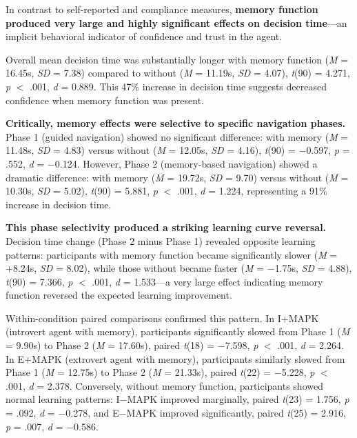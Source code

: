 \documentclass[12pt]{article}
\begin{document}
In contrast to self-reported and compliance measures, \textbf{memory function produced very large and highly significant effects on decision time}---an implicit behavioral indicator of confidence and trust in the agent.

Overall mean decision time was substantially longer with memory function (\textit{M} = 16.45s, \textit{SD} = 7.38) compared to without (\textit{M} = 11.19s, \textit{SD} = 4.07), \textit{t}(90) = 4.271, \textit{p} $<$ .001, \textit{d} = 0.889. This 47\% increase in decision time suggests decreased confidence when memory function was present.

\textbf{Critically, memory effects were selective to specific navigation phases.} Phase 1 (guided navigation) showed no significant difference: with memory (\textit{M} = 11.48s, \textit{SD} = 4.83) versus without (\textit{M} = 12.05s, \textit{SD} = 4.16), \textit{t}(90) = $-$0.597, \textit{p} = .552, \textit{d} = $-$0.124. However, Phase 2 (memory-based navigation) showed a dramatic difference: with memory (\textit{M} = 19.72s, \textit{SD} = 9.70) versus without (\textit{M} = 10.30s, \textit{SD} = 5.02), \textit{t}(90) = 5.881, \textit{p} $<$ .001, \textit{d} = 1.224, representing a 91\% increase in decision time.

\textbf{This phase selectivity produced a striking learning curve reversal.} Decision time change (Phase 2 minus Phase 1) revealed opposite learning patterns: participants with memory function became significantly slower (\textit{M} = +8.24s, \textit{SD} = 8.02), while those without became faster (\textit{M} = $-$1.75s, \textit{SD} = 4.88), \textit{t}(90) = 7.366, \textit{p} $<$ .001, \textit{d} = 1.533---a very large effect indicating memory function reversed the expected learning improvement.

Within-condition paired comparisons confirmed this pattern. In I+MAPK (introvert agent with memory), participants significantly slowed from Phase 1 (\textit{M} = 9.90s) to Phase 2 (\textit{M} = 17.60s), paired \textit{t}(18) = $-$7.598, \textit{p} $<$ .001, \textit{d} = 2.264. In E+MAPK (extrovert agent with memory), participants similarly slowed from Phase 1 (\textit{M} = 12.75s) to Phase 2 (\textit{M} = 21.33s), paired \textit{t}(22) = $-$5.228, \textit{p} $<$ .001, \textit{d} = 2.378. Conversely, without memory function, participants showed normal learning patterns: I$-$MAPK improved marginally, paired \textit{t}(23) = 1.756, \textit{p} = .092, \textit{d} = $-$0.278, and E$-$MAPK improved significantly, paired \textit{t}(25) = 2.916, \textit{p} = .007, \textit{d} = $-$0.586.
\end{document}

